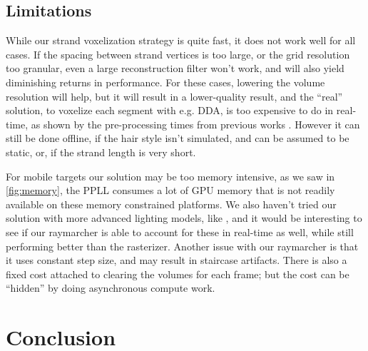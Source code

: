 \documentclass{egpubl}
\begin{document}
\newpage

\subsection{Limitations} \label{sec:limitations}


While our strand voxelization strategy is quite fast, it does not work well for all cases. If the spacing between strand vertices is too large, or the grid resolution too granular, even a large reconstruction filter won't work, and will also yield diminishing returns in performance. For these cases, lowering the volume resolution will help, but it will result in a lower-quality result, and the ``real'' solution, to voxelize each segment with e.g. DDA, is too expensive to do in real-time, as shown by the pre-processing times from previous works \cite{kanzler2018voxel}. However it can still be done offline, if the hair style isn't simulated, and can be assumed to be static, or, if the strand length is very short.

For mobile targets our solution may be too memory intensive, as we saw in \cref{fig:memory}, the PPLL consumes a lot of GPU memory that is not readily available on these memory constrained platforms. We also haven't tried our solution with more advanced lighting models, like \cite{nguyen2005hair}, and it would be interesting to see if our raymarcher is able to account for these in real-time as well, while still performing better than the rasterizer. Another issue with our raymarcher is that it uses constant step size, and may result in staircase artifacts. There is also a fixed cost attached to clearing the volumes for each frame; but the cost can be ``hidden'' by doing asynchronous compute work.

\section{Conclusion} \label{sec:conclusion}

\end{document}
